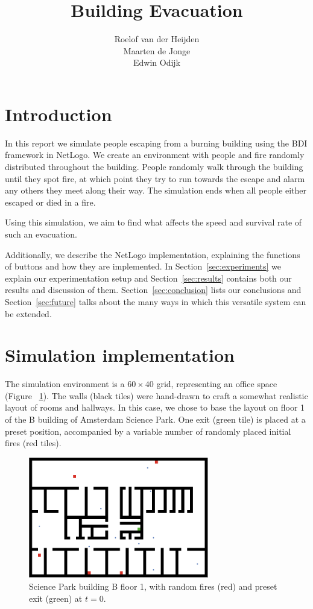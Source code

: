 \documentclass[a4paper]{article}
\title{Building Evacuation}
\author{ Roelof van der Heijden \\
         Maarten de Jonge\\
       Edwin Odijk}
\begin{document}
\maketitle

\section{Introduction}
In this report we simulate people escaping from a burning building using the BDI framework in NetLogo. We create an environment with people and fire randomly distributed throughout the building. People randomly walk through the building until they spot fire, at which point they try to run towards the escape and alarm any others they meet along their way. The simulation ends when all people either escaped or died in a fire.

Using this simulation, we aim to find what affects the speed and survival rate of such an evacuation.

Additionally, we describe the NetLogo implementation, explaining the functions of buttons and how they are implemented. In Section~\ref{sec:experiments} we explain our experimentation setup and Section~\ref{sec:results} contains both our results and discussion of them. Section~\ref{sec:conclusion} lists our conclusions and Section~\ref{sec:future} talks about the many ways in which this versatile system can be extended.

\section{Simulation implementation}
\FloatBarrier
The simulation environment is a \(60\times 40\) grid, representing an office space (Figure~
\ref{fig:sp}). The walls (black tiles) were hand-drawn to craft a somewhat
realistic layout of rooms and hallways. In this case, we chose to base the layout on floor 1 of the B building of Amsterdam Science Park. One exit (green tile) is placed
at a preset position, accompanied by a variable number of randomly placed initial fires (red tiles). 

\begin{figure}[h!]
  \centering
  \includegraphics[width=0.7\textwidth]{sp.png}
  \caption{Science Park building B floor 1, with random fires (red) and preset exit (green) at \(t=0\).}
  \label{fig:sp}
\end{figure}
\end{document}
